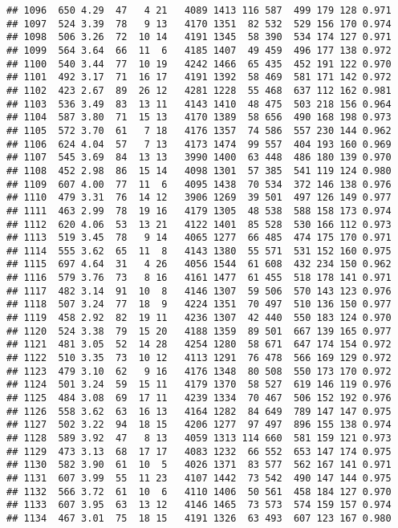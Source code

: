 \documentclass[]{article}
\begin{document}
\begin{verbatim}
## 1096  650 4.29  47   4 21   4089 1413 116 587  499 179 128 0.971
## 1097  524 3.39  78   9 13   4170 1351  82 532  529 156 170 0.974
## 1098  506 3.26  72  10 14   4191 1345  58 390  534 174 127 0.971
## 1099  564 3.64  66  11  6   4185 1407  49 459  496 177 138 0.972
## 1100  540 3.44  77  10 19   4242 1466  65 435  452 191 122 0.970
## 1101  492 3.17  71  16 17   4191 1392  58 469  581 171 142 0.972
## 1102  423 2.67  89  26 12   4281 1228  55 468  637 112 162 0.981
## 1103  536 3.49  83  13 11   4143 1410  48 475  503 218 156 0.964
## 1104  587 3.80  71  15 13   4170 1389  58 656  490 168 198 0.973
## 1105  572 3.70  61   7 18   4176 1357  74 586  557 230 144 0.962
## 1106  624 4.04  57   7 13   4173 1474  99 557  404 193 160 0.969
## 1107  545 3.69  84  13 13   3990 1400  63 448  486 180 139 0.970
## 1108  452 2.98  86  15 14   4098 1301  57 385  541 119 124 0.980
## 1109  607 4.00  77  11  6   4095 1438  70 534  372 146 138 0.976
## 1110  479 3.31  76  14 12   3906 1269  39 501  497 126 149 0.977
## 1111  463 2.99  78  19 16   4179 1305  48 538  588 158 173 0.974
## 1112  620 4.06  53  13 21   4122 1401  85 528  530 166 112 0.973
## 1113  519 3.45  78   9 14   4065 1277  66 485  474 175 170 0.971
## 1114  555 3.62  65  11  8   4143 1380  55 571  531 152 160 0.975
## 1115  697 4.64  31   4 26   4056 1544  61 608  432 234 150 0.962
## 1116  579 3.76  73   8 16   4161 1477  61 455  518 178 141 0.971
## 1117  482 3.14  91  10  8   4146 1307  59 506  570 143 123 0.976
## 1118  507 3.24  77  18  9   4224 1351  70 497  510 136 150 0.977
## 1119  458 2.92  82  19 11   4236 1307  42 440  550 183 124 0.970
## 1120  524 3.38  79  15 20   4188 1359  89 501  667 139 165 0.977
## 1121  481 3.05  52  14 28   4254 1280  58 671  647 174 154 0.972
## 1122  510 3.35  73  10 12   4113 1291  76 478  566 169 129 0.972
## 1123  479 3.10  62   9 16   4176 1348  80 508  550 173 170 0.972
## 1124  501 3.24  59  15 11   4179 1370  58 527  619 146 119 0.976
## 1125  484 3.08  69  17 11   4239 1334  70 467  506 152 192 0.976
## 1126  558 3.62  63  16 13   4164 1282  84 649  789 147 147 0.975
## 1127  502 3.22  94  18 15   4206 1277  97 497  896 155 138 0.974
## 1128  589 3.92  47   8 13   4059 1313 114 660  581 159 121 0.973
## 1129  473 3.13  68  17 17   4083 1232  66 552  653 147 174 0.975
## 1130  582 3.90  61  10  5   4026 1371  83 577  562 167 141 0.971
## 1131  607 3.99  55  11 23   4107 1442  73 542  490 147 144 0.975
## 1132  566 3.72  61  10  6   4110 1406  50 561  458 184 127 0.970
## 1133  607 3.95  63  13 12   4146 1465  73 573  574 159 157 0.974
## 1134  467 3.01  75  18 15   4191 1326  63 493  607 123 167 0.980

\end{verbatim}
\end{document}
